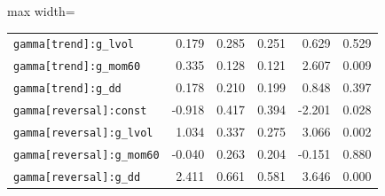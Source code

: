 \begin{table}[!htbp]
\begin{adjustbox}{max width=\textwidth}
\begin{tabular}{lrrrrr}
\texttt{gamma[trend]:g\_lvol} & 0.179 & 0.285 & 0.251 & 0.629 & 0.529\\
\texttt{gamma[trend]:g\_mom60} & 0.335 & 0.128 & 0.121 & 2.607 & 0.009\\
\texttt{gamma[trend]:g\_dd} & 0.178 & 0.210 & 0.199 & 0.848 & 0.397\\
\texttt{gamma[reversal]:const} & -0.918 & 0.417 & 0.394 & -2.201 & 0.028\\
\texttt{gamma[reversal]:g\_lvol} & 1.034 & 0.337 & 0.275 & 3.066 & 0.002\\
\texttt{gamma[reversal]:g\_mom60} & -0.040 & 0.263 & 0.204 & -0.151 & 0.880\\
\texttt{gamma[reversal]:g\_dd} & 2.411 & 0.661 & 0.581 & 3.646 & 0.000\\
\bottomrule
\end{tabular}
\end{adjustbox}
\end{table}
